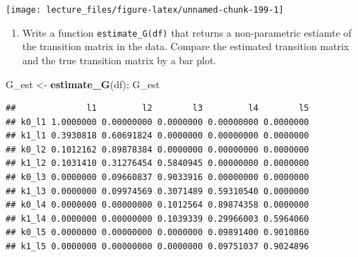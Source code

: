 \documentclass[]{book}
\newenvironment{Shaded}{\begin{snugshade}}{\end{snugshade}}
\newcommand{\KeywordTok}[1]{\textcolor[rgb]{0.13,0.29,0.53}{\textbf{#1}}}
\newcommand{\DataTypeTok}[1]{\textcolor[rgb]{0.13,0.29,0.53}{#1}}
\newcommand{\StringTok}[1]{\textcolor[rgb]{0.31,0.60,0.02}{#1}}
\newcommand{\OperatorTok}[1]{\textcolor[rgb]{0.81,0.36,0.00}{\textbf{#1}}}
\newcommand{\NormalTok}[1]{#1}
\providecommand{\tightlist}{%
  \setlength{\itemsep}{0pt}\setlength{\parskip}{0pt}}
\begin{document}
\begin{Shaded}
\end{Shaded}

\begin{center}\texttt{[image: lecture\_files/figure-latex/unnamed-chunk-199-1]} \end{center}

\begin{enumerate}
\def\labelenumi{\arabic{enumi}.}
\setcounter{enumi}{8}
\tightlist
\item
  Write a function \texttt{estimate\_G(df)} that returns a
  non-parametric estiamte of the transition matrix in the data. Compare
  the estimated transition matrix and the true transition matrix by a
  bar plot.
\end{enumerate}

\begin{Shaded}
\begin{Highlighting}[]
\NormalTok{G_est <-}\StringTok{ }\KeywordTok{estimate_G}\NormalTok{(df); G_est}
\end{Highlighting}
\end{Shaded}

\begin{verbatim}
##              l1         l2        l3         l4        l5
## k0_l1 1.0000000 0.00000000 0.0000000 0.00000000 0.0000000
## k1_l1 0.3930818 0.60691824 0.0000000 0.00000000 0.0000000
## k0_l2 0.1012162 0.89878384 0.0000000 0.00000000 0.0000000
## k1_l2 0.1031410 0.31276454 0.5840945 0.00000000 0.0000000
## k0_l3 0.0000000 0.09660837 0.9033916 0.00000000 0.0000000
## k1_l3 0.0000000 0.09974569 0.3071489 0.59310540 0.0000000
## k0_l4 0.0000000 0.00000000 0.1012564 0.89874358 0.0000000
## k1_l4 0.0000000 0.00000000 0.1039339 0.29966003 0.5964060
## k0_l5 0.0000000 0.00000000 0.0000000 0.09891400 0.9010860
## k1_l5 0.0000000 0.00000000 0.0000000 0.09751037 0.9024896
\end{verbatim}
\end{document}
